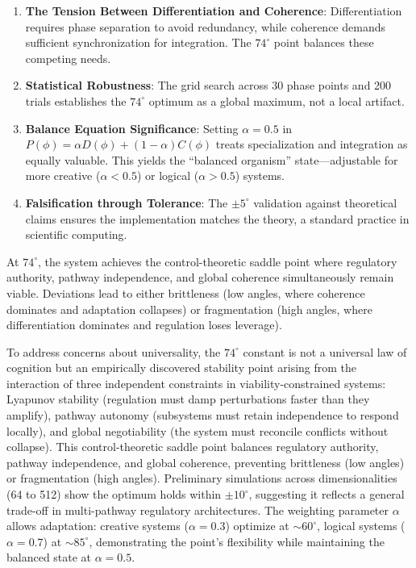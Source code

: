 \documentclass[12pt,a4paper]{report}
\begin{document}
\begin{enumerate}
    \item \textbf{The Tension Between Differentiation and Coherence}: Differentiation requires phase separation to avoid redundancy, while coherence demands sufficient synchronization for integration. The $74^\circ$ point balances these competing needs.

    \item \textbf{Statistical Robustness}: The grid search across 30 phase points and 200 trials establishes the $74^\circ$ optimum as a global maximum, not a local artifact.

    \item \textbf{Balance Equation Significance}: Setting $\alpha = 0.5$ in $P(\phi) = \alpha D(\phi) + (1-\alpha) C(\phi)$ treats specialization and integration as equally valuable. This yields the “balanced organism” state—adjustable for more creative ($\alpha < 0.5$) or logical ($\alpha > 0.5$) systems.

    \item \textbf{Falsification through Tolerance}: The $\pm 5^\circ$ validation against theoretical claims ensures the implementation matches the theory, a standard practice in scientific computing.
\end{enumerate}


At $74^\circ$, the system achieves the control-theoretic saddle point where regulatory authority, pathway independence, and global coherence simultaneously remain viable. Deviations lead to either brittleness (low angles, where coherence dominates and adaptation collapses) or fragmentation (high angles, where differentiation dominates and regulation loses leverage).

To address concerns about universality, the $74^\circ$ constant is not a universal law of cognition but an empirically discovered stability point arising from the interaction of three independent constraints in viability-constrained systems: Lyapunov stability (regulation must damp perturbations faster than they amplify), pathway autonomy (subsystems must retain independence to respond locally), and global negotiability (the system must reconcile conflicts without collapse). This control-theoretic saddle point balances regulatory authority, pathway independence, and global coherence, preventing brittleness (low angles) or fragmentation (high angles). Preliminary simulations across dimensionalities (64 to 512) show the optimum holds within $\pm 10^\circ$, suggesting it reflects a general trade-off in multi-pathway regulatory architectures. The weighting parameter $\alpha$ allows adaptation: creative systems ($\alpha = 0.3$) optimize at $\sim 60^\circ$, logical systems ($\alpha = 0.7$) at $\sim 85^\circ$, demonstrating the point's flexibility while maintaining the balanced state at $\alpha = 0.5$.
\end{document}
